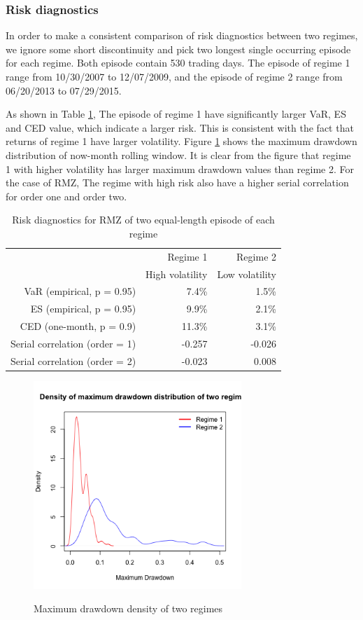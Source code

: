 \documentclass[12pt]{article}
\begin{document}
\subsubsection{Risk diagnostics}

In order to make a consistent comparison of risk diagnostics between two regimes, we ignore some short discontinuity and pick two longest single occurring episode for each regime. Both episode contain 530 trading days. The episode of regime 1 range from 10/30/2007 to 12/07/2009, and the episode of regime 2 range from 06/20/2013 to 07/29/2015.

As shown in Table \ref{table:ridkDiagsRegimeRMZ}, The episode of regime 1 have significantly larger VaR, ES and CED value, which indicate a larger risk. This is consistent with the fact that returns of regime 1 have larger volatility. Figure \ref{fig: RMZregime_mdd} shows the maximum drawdown distribution of now-month rolling window. It is clear from the figure that regime 1 with higher volatility has larger maximum drawdown values than regime 2. For the case of RMZ, The regime with high risk also have a higher serial correlation for order one and order two. 

\begin{table}[!h]
\caption{Risk diagnostics for RMZ of two equal-length episode of each regime} 
\centering 
\begin{tabular}{| r | r | r |} 
 \hline
& Regime 1 & Regime 2 \\
& High volatility & Low volatility \\
 \hline 
VaR (empirical, p = 0.95) & 7.4\% & 1.5\% \\
ES (empirical, p = 0.95) & 9.9\% & 2.1\% \\
CED (one-month, p = 0.9) & 11.3\% & 3.1\% \\
Serial correlation (order = 1) & -0.257 & -0.026 \\
Serial correlation (order = 2) & -0.023 & 0.008 \\
 \hline
\end{tabular}
\label{table:ridkDiagsRegimeRMZ}
\end{table}


\begin{figure}[h]
\caption{Maximum drawdown density of two regimes} 
\centering 
\includegraphics[width=0.7\textwidth]{../results/regime/RMZ_mon1_mdd}
\label{fig: RMZregime_mdd}
\end{figure}

\iffalse
\end{document}
